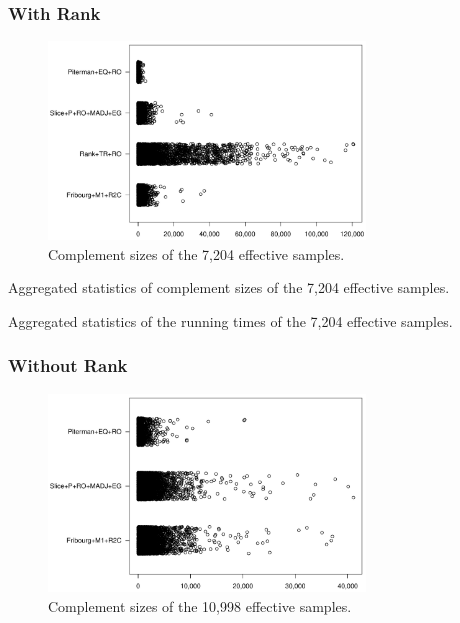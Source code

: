 \subsubsection{With Rank}

\begin{figure}[ht]
\centering
\includegraphics[width=0.75\textwidth]{figures/r/external/goal/s.stripchart.with_rank.pdf}
\caption{Complement sizes of the 7,204 effective samples.}
\end{figure}

\begin{table}[ht]
\centering

\caption{Aggregated statistics of complement sizes of the 7,204 effective samples.}
\end{table}

\begin{table}[ht]
\centering

\caption{Aggregated statistics of the running times of the 7,204 effective samples.}
\end{table}


\subsubsection{Without Rank}


\begin{figure}[ht]
\centering
\includegraphics[width=0.75\textwidth]{figures/r/external/goal/s.stripchart.pdf}
\caption{Complement sizes of the 10,998  effective samples.}
\end{figure}


